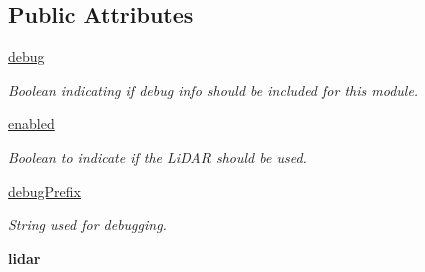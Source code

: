 \subsection*{Public Attributes}
\begin{DoxyCompactItemize}
\item 
\mbox{\label{classmcs_1_1firmware_1_1rpLiDAR__A2M4__R4__backup_1_1rpLiDAR__A2M4__R4_a4a51df16d72b07851757321614b0870d}} 
\hyperlink{classmcs_1_1firmware_1_1rpLiDAR__A2M4__R4__backup_1_1rpLiDAR__A2M4__R4_a4a51df16d72b07851757321614b0870d}{debug}
\begin{DoxyCompactList}\small\item\em Boolean indicating if debug info should be included for this module. \end{DoxyCompactList}\item 
\hyperlink{classmcs_1_1firmware_1_1rpLiDAR__A2M4__R4__backup_1_1rpLiDAR__A2M4__R4_a7072a51d322b1c3ae1f606635362d8a1}{enabled}
\begin{DoxyCompactList}\small\item\em Boolean to indicate if the Li\+D\+AR should be used. \end{DoxyCompactList}\item 
\mbox{\label{classmcs_1_1firmware_1_1rpLiDAR__A2M4__R4__backup_1_1rpLiDAR__A2M4__R4_a56737aeedf84f32554662f495e20dc37}} 
\hyperlink{classmcs_1_1firmware_1_1rpLiDAR__A2M4__R4__backup_1_1rpLiDAR__A2M4__R4_a56737aeedf84f32554662f495e20dc37}{debug\+Prefix}
\begin{DoxyCompactList}\small\item\em String used for debugging. \end{DoxyCompactList}\item 
\mbox{\label{classmcs_1_1firmware_1_1rpLiDAR__A2M4__R4__backup_1_1rpLiDAR__A2M4__R4_a400acb3e875e4e1c86348d2e74d8212f}} 
{\bfseries lidar}
\end{DoxyCompactItemize}


